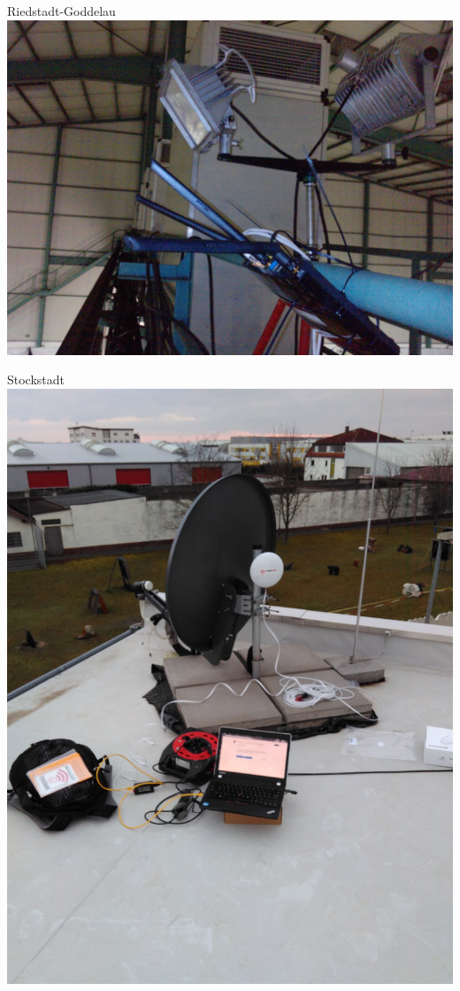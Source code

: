 \documentclass[t]{beamer}
\begin{document}
  \begin{frame}{Riedstadt-Goddelau}
    \center
    \includegraphics[height=0.75\textheight]{images/heae-goddelau-traeger.jpg}
  \end{frame}

  \begin{frame}{Stockstadt}
    \center
    \includegraphics[height=0.75\textheight]{images/unterkunft-stockstadt-dach.jpg}
  \end{frame}
\end{document}
